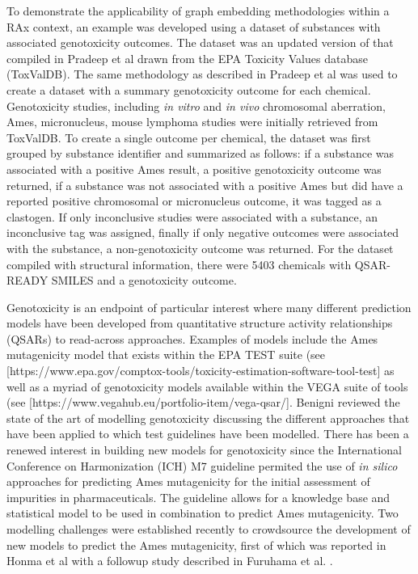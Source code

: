 \documentclass[
  super,
  preprint,
  3p]{elsarticle}
\begin{document}
To demonstrate the applicability of graph embedding methodologies within
a RAx context, an example was developed using a dataset of substances
with associated genotoxicity outcomes. The dataset was an updated
version of that compiled in Pradeep et al
\citep{pradeep_evaluation_2021} drawn from the EPA Toxicity Values
database (ToxValDB). The same methodology as described in Pradeep et al
\citep{pradeep_evaluation_2021} was used to create a dataset with a
summary genotoxicity outcome for each chemical. Genotoxicity studies,
including \emph{in vitro} and \emph{in vivo} chromosomal aberration,
Ames, micronucleus, mouse lymphoma studies were initially retrieved from
ToxValDB. To create a single outcome per chemical, the dataset was first
grouped by substance identifier and summarized as follows: if a
substance was associated with a positive Ames result, a positive
genotoxicity outcome was returned, if a substance was not associated
with a positive Ames but did have a reported positive chromosomal or
micronucleus outcome, it was tagged as a clastogen. If only inconclusive
studies were associated with a substance, an inconclusive tag was
assigned, finally if only negative outcomes were associated with the
substance, a non-genotoxicity outcome was returned. For the dataset
compiled with structural information, there were 5403 chemicals with
QSAR-READY SMILES and a genotoxicity outcome.

Genotoxicity is an endpoint of particular interest where many different
prediction models have been developed from quantitative structure
activity relationships (QSARs) to read-across approaches. Examples of
models include the Ames mutagenicity model that exists within the EPA
TEST suite (see
{[}https://www.epa.gov/comptox-tools/toxicity-estimation-software-tool-test{]}
as well as a myriad of genotoxicity models available within the VEGA
suite of tools (see
{[}https://www.vegahub.eu/portfolio-item/vega-qsar/{]}. Benigni reviewed
the state of the art of modelling genotoxicity
\citep{benigni_data-based_2019} discussing the different approaches that
have been applied to which test guidelines have been modelled. There has
been a renewed interest in building new models for genotoxicity since
the International Conference on Harmonization (ICH) M7 guideline
permited the use of \emph{in silico} approaches for predicting Ames
mutagenicity for the initial assessment of impurities in
pharmaceuticals. The guideline allows for a knowledge base and
statistical model to be used in combination to predict Ames
mutagenicity. Two modelling challenges were established recently to
crowdsource the development of new models to predict the Ames
mutagenicity, first of which was reported in Honma et al
\citep{honma_improvement_2019} with a followup study described in
Furuhama et al. \citep{Furuhama_2023}.
\end{document}
